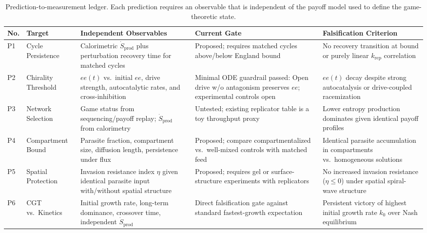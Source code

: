 \documentclass[12pt,a4paper]{article}
\theoremstyle{remark}
\begin{document}
\begin{table}[htbp]
\centering
\caption{Prediction-to-measurement ledger. Each prediction requires an observable that is independent of the payoff model used to define the game-theoretic state.}
\label{tab:prediction-ledger}
\scriptsize
\setlength{\tabcolsep}{2pt}
\begin{tabularx}{\textwidth}{@{}>{\raggedright\arraybackslash}p{}>{\raggedright\arraybackslash}p{}>{\raggedright\arraybackslash}p{}>{\raggedright\arraybackslash}p{}>{\raggedright\arraybackslash}X@{}}
\toprule
\textbf{No.} & \textbf{Target} & \textbf{Independent Observables} & \textbf{Current Gate} & \textbf{Falsification Criterion} \\
\midrule
P1 & Cycle Persistence & Calorimetric $\dot{S}_{\mathrm{prod}}$ plus perturbation recovery time for matched cycles & Proposed; requires matched cycles above/below England bound & No recovery transition at bound or purely linear $k_{\mathrm{rep}}$ correlation \\
P2 & Chirality Threshold & $ee(t)$ vs.\ initial $ee$, drive strength, autocatalytic rates, and cross-inhibition & Minimal ODE guardrail passed: Open drive w/o antagonism preserves $ee$; experimental controls open & $ee(t)$ decay despite strong autocatalysis or drive-coupled racemization \\
P3 & Network Selection & Game status from sequencing/payoff replay; $\dot{S}_{\mathrm{prod}}$ from calorimetry & Untested; existing replicator table is a toy throughput proxy & Lower entropy production dominates given identical payoff profiles \\
P4 & Compartment Bound & Parasite fraction, compartment size, diffusion length, persistence under flux & Proposed; compare compartmentalized vs.\ well-mixed controls with matched feed & Identical parasite accumulation in compartments vs.\ homogeneous solutions \\
P5 & Spatial Protection & Invasion resistance index $\eta$ given identical parasite input with/without spatial structure & Proposed; requires gel or surface-structure experiments with replicators & No increased invasion resistance ($\eta \le 0$) under spatial spiral-wave structure \\
P6 & CGT vs.\ Kinetics & Initial growth rate, long-term dominance, crossover time, independent $\dot{S}_{\mathrm{prod}}$ & Direct falsification gate against standard fastest-growth expectation & Persistent victory of highest initial growth rate $k_0$ over Nash equilibrium \\
\bottomrule
\end{tabularx}
\end{table}
\end{document}
